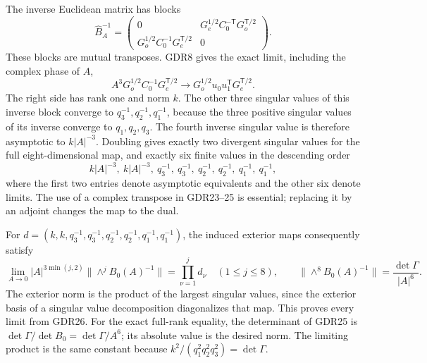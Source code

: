 \documentclass[10pt]{article}
\begin{document}
The inverse Euclidean matrix has blocks
\begin{equation}
 \widehat B_A^{-1}=
 \begin{pmatrix}
 0&G_e^{1/2}C_0^{-\mathsf T}G_o^{\mathsf T/2}\\
 G_o^{1/2}C_0^{-1}G_e^{\mathsf T/2}&0
 \end{pmatrix}.
 \tag{GDR25}
\end{equation}
These blocks are mutual transposes. GDR8 gives the exact
limit, including the complex phase of $A$,
\[
 A^3G_o^{1/2}C_0^{-1}G_e^{\mathsf T/2}
 \longrightarrow G_o^{1/2}u_0u_1^{\mathsf T}G_e^{\mathsf T/2}.
\]
The right side has rank one and norm $k$. The other three
singular values of this inverse block converge to
$q_3^{-1},q_2^{-1},q_1^{-1}$, because the three positive
singular values of its inverse converge to $q_1,q_2,q_3$.
The fourth inverse singular value is therefore asymptotic
to $k|A|^{-3}$. Doubling gives exactly two divergent singular
values for the full eight-dimensional map, and exactly six
finite values in the descending order
\begin{equation}
 k|A|^{-3},\ k|A|^{-3},\
 q_3^{-1},\ q_3^{-1},\ q_2^{-1},\ q_2^{-1},\ q_1^{-1},\ q_1^{-1},
 \tag{GDR26}
\end{equation}
where the first two entries denote asymptotic equivalents
and the other six denote limits. The use of a complex
transpose in GDR23--25 is essential; replacing it by an
adjoint changes the map to the dual.

For $d=(k,k,q_3^{-1},q_3^{-1},q_2^{-1},q_2^{-1},q_1^{-1},q_1^{-1})$,
the induced exterior maps consequently satisfy
\begin{equation}
 \lim_{A\to0}|A|^{3\min(j,2)}
       \|\wedge^j B_0(A)^{-1}\|
   =\prod_{\nu=1}^j d_\nu\quad(1\le j\le8),\qquad
 \|\wedge^8 B_0(A)^{-1}\|
       =\frac{\det\Gamma}{|A|^6}.
 \tag{GDR27}
\end{equation}
The exterior norm is the product of the largest singular
values, since the exterior basis of a singular value
decomposition diagonalizes that map. This proves every
limit from GDR26. For the exact full-rank equality, the
determinant of GDR25 is
$\det\Gamma/\det B_0=\det\Gamma/A^6$; its absolute value
is the desired norm. The limiting product is the same
constant because $k^2/(q_1^2q_2^2q_3^2)=\det\Gamma$.
\end{document}
